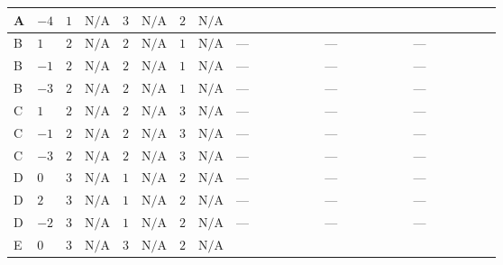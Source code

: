 \documentclass[8pt]{article}
\begin{document}
\begin{landscape}
\begin{longtable}{@{}llcccccc >{\raggedright\arraybackslash}p{0.21\linewidth} >{\raggedright\arraybackslash}p{0.21\linewidth} >{\raggedright\arraybackslash}p{0.21\linewidth}@{}}
\midrule
A & $-4$ & $1$ & $\text{N/A}$ & $3$ & $\text{N/A}$ & $2$ & $\text{N/A}$ & \scriptsize\adjustbox{max width=\linewidth}{$\begin{gathered} +3 {\lambda_{HS_2}^{(A)}}^2\end{gathered}$} & \scriptsize\adjustbox{max width=\linewidth}{$\begin{gathered} +12 {\lambda_{S_2}^{(1)}} {\lambda_{S_2}^{(A)}}\end{gathered}$} & \scriptsize\adjustbox{max width=\linewidth}{$\begin{gathered} +20 {\lambda_{S_2}^{(A)}}^2\end{gathered}$} \\
\midrule
B & $1$ & $2$ & $\text{N/A}$ & $2$ & $\text{N/A}$ & $1$ & $\text{N/A}$ & --- & --- & --- \\
\midrule
B & $-1$ & $2$ & $\text{N/A}$ & $2$ & $\text{N/A}$ & $1$ & $\text{N/A}$ & --- & --- & --- \\
\midrule
B & $-3$ & $2$ & $\text{N/A}$ & $2$ & $\text{N/A}$ & $1$ & $\text{N/A}$ & --- & --- & --- \\
\midrule
C & $1$ & $2$ & $\text{N/A}$ & $2$ & $\text{N/A}$ & $3$ & $\text{N/A}$ & --- & --- & --- \\
\midrule
C & $-1$ & $2$ & $\text{N/A}$ & $2$ & $\text{N/A}$ & $3$ & $\text{N/A}$ & --- & --- & --- \\
\midrule
C & $-3$ & $2$ & $\text{N/A}$ & $2$ & $\text{N/A}$ & $3$ & $\text{N/A}$ & --- & --- & --- \\
\midrule
D & $0$ & $3$ & $\text{N/A}$ & $1$ & $\text{N/A}$ & $2$ & $\text{N/A}$ & --- & --- & --- \\
\midrule
D & $2$ & $3$ & $\text{N/A}$ & $1$ & $\text{N/A}$ & $2$ & $\text{N/A}$ & --- & --- & --- \\
\midrule
D & $-2$ & $3$ & $\text{N/A}$ & $1$ & $\text{N/A}$ & $2$ & $\text{N/A}$ & --- & --- & --- \\
\midrule
E & $0$ & $3$ & $\text{N/A}$ & $3$ & $\text{N/A}$ & $2$ & $\text{N/A}$ & \scriptsize\adjustbox{max width=\linewidth}{$\begin{gathered} +3 {\lambda_{HS_2}^{(A)}}^2\end{gathered}$} & \scriptsize\adjustbox{max width=\linewidth}{$\begin{gathered} +12 {\lambda_{S_2}^{(1)}} {\lambda_{S_2}^{(A)}}\end{gathered}$} & \scriptsize\adjustbox{max width=\linewidth}{$\begin{gathered} +20 {\lambda_{S_2}^{(A)}}^2\end{gathered}$} \\

\end{longtable}
\end{landscape}
\end{document}
